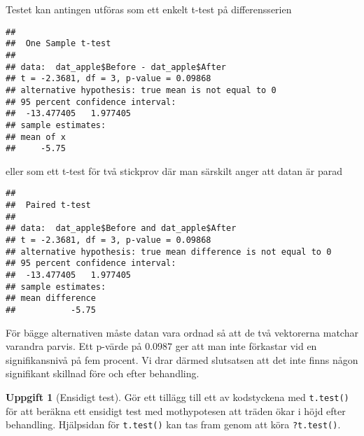 \documentclass[
]{book}
\newenvironment{Shaded}{\begin{snugshade}}{\end{snugshade}}
\newcommand{\AttributeTok}[1]{\textcolor[rgb]{0.13,0.29,0.53}{#1}}
\newcommand{\FunctionTok}[1]{\textcolor[rgb]{0.13,0.29,0.53}{\textbf{#1}}}
\newcommand{\NormalTok}[1]{#1}
\newcommand{\SpecialCharTok}[1]{\textcolor[rgb]{0.81,0.36,0.00}{\textbf{#1}}}
\theoremstyle{definition}
\theoremstyle{definition}
\theoremstyle{definition}
\newtheorem{exercise}{Uppgift}[chapter]
\theoremstyle{definition}
\theoremstyle{remark}
\begin{document}
Testet kan antingen utföras som ett enkelt t-test på differensserien

\begin{Shaded}
\end{Shaded}

\begin{verbatim}
## 
##  One Sample t-test
## 
## data:  dat_apple$Before - dat_apple$After
## t = -2.3681, df = 3, p-value = 0.09868
## alternative hypothesis: true mean is not equal to 0
## 95 percent confidence interval:
##  -13.477405   1.977405
## sample estimates:
## mean of x 
##     -5.75
\end{verbatim}

eller som ett t-test för två stickprov där man särskilt anger att datan är parad

\begin{Shaded}
\end{Shaded}

\begin{verbatim}
## 
##  Paired t-test
## 
## data:  dat_apple$Before and dat_apple$After
## t = -2.3681, df = 3, p-value = 0.09868
## alternative hypothesis: true mean difference is not equal to 0
## 95 percent confidence interval:
##  -13.477405   1.977405
## sample estimates:
## mean difference 
##           -5.75
\end{verbatim}

För bägge alternativen måste datan vara ordnad så att de två vektorerna matchar varandra parvis. Ett p-värde på \(0.0987\) ger att man inte förkastar vid en signifikansnivå på fem procent. Vi drar därmed slutsatsen att det inte finns någon signifikant skillnad före och efter behandling.

\begin{exercise}[Ensidigt test]
Gör ett tillägg till ett av kodstyckena med \texttt{t.test()} för att beräkna ett ensidigt test med mothypotesen att träden ökar i höjd efter behandling. Hjälpsidan för \texttt{t.test()} kan tas fram genom att köra \texttt{?t.test()}.
\end{exercise}
\end{document}
